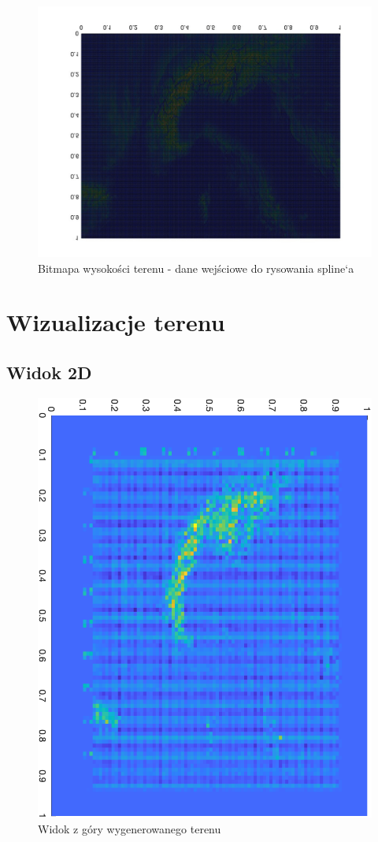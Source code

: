 \documentclass{article}
\begin{document}
\begin{figure}[H]
    \centering
    \includegraphics[width=0.95\linewidth]{terrrain_map.jpg}
    \caption{Bitmapa wysokości terenu \newline - dane wejściowe do rysowania spline`a}
    \label{fig:height-map}
\end{figure}

\section{Wizualizacje terenu}

\subsection{Widok 2D}
\begin{figure}[H]
    \centering
    \includegraphics[width=0.7\linewidth]{2D.png}
    \caption{Widok z góry wygenerowanego terenu}
    \label{fig:2d-view}
\end{figure}
\end{document}
